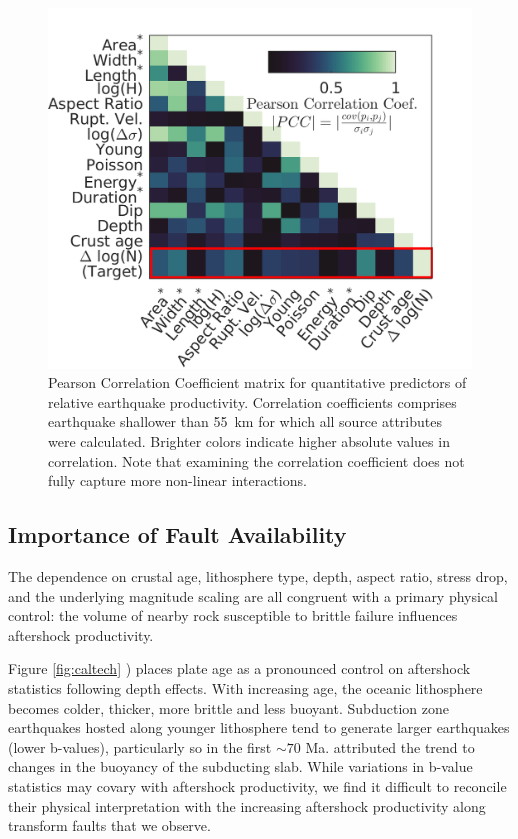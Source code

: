 \documentclass[draft, jgrga]{agujournal2018}
\begin{document}
 \begin{figure}
    \centering
    \includegraphics{figures/covariance_plot.png}
    \caption{Pearson Correlation Coefficient matrix for quantitative predictors of relative earthquake productivity. Correlation coefficients comprises earthquake shallower than 55~km for which all source attributes were calculated. Brighter colors indicate higher absolute values in correlation. Note that examining the correlation coefficient does not fully capture more non-linear interactions.}
    \label{fig:covariance}
\end{figure}   
    
\subsection{Importance of Fault Availability}

The dependence on crustal age, lithosphere type, depth, aspect ratio, stress drop, and the underlying magnitude scaling are all congruent with a primary physical control: the volume of nearby rock susceptible to brittle failure influences aftershock productivity. 

Figure \ref{fig:caltech} ) places plate age as a pronounced control on aftershock statistics following depth effects. With increasing age, the oceanic lithosphere becomes colder, thicker, more brittle and less buoyant. Subduction zone earthquakes hosted along younger lithosphere tend to generate larger earthquakes (lower b-values), particularly so in the first $\sim70$ Ma. \citet{Nishikawa2014EarthquakeBuoyancy} attributed the trend to changes in the buoyancy of the subducting slab. While variations in b-value statistics may covary with aftershock productivity, we find it difficult to reconcile their physical interpretation with the increasing aftershock productivity along transform faults that we observe. 
\end{document}
